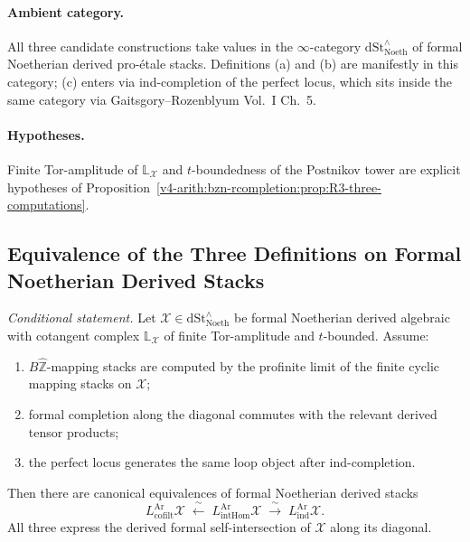 \paragraph{Ambient category.} All three candidate
constructions take values in the \(\infty\)-category
\(\mathrm{dSt}^{\wedge}_{\mathrm{Noeth}}\) of formal Noetherian
derived pro-\'etale stacks. Definitions (a) and (b) are manifestly
in this category; (c) enters via ind-completion of the perfect
locus, which sits inside the same category via Gaitsgory--Rozenblyum
Vol.~I Ch.~5.

\paragraph{Hypotheses.} Finite Tor-amplitude of
\(\mathbb{L}_{\mathcal{X}}\) and \(t\)-boundedness of the Postnikov
tower are explicit hypotheses of
Proposition~\ref{v4-arith:bzn-rcompletion:prop:R3-three-computations}.

\subsection{Equivalence of the Three Definitions on Formal Noetherian Derived Stacks}

\begin{theorem}
\label{v4-arith:bzn-rcompletion:thm:R3-three-agree}
\emph{Conditional statement.} Let \(\mathcal{X}\in\mathrm{dSt}^{\wedge}_{\mathrm{Noeth}}\)
be formal Noetherian derived algebraic with cotangent complex
\(\mathbb{L}_{\mathcal{X}}\) of finite Tor-amplitude and
\(t\)-bounded. Assume:
\begin{enumerate}
\item \(B\widehat{\mathbb Z}\)-mapping stacks are computed by the
profinite limit of the finite cyclic mapping stacks on \(\mathcal X\);
\item formal completion along the diagonal commutes with the relevant
derived tensor products;
\item the perfect locus generates the same loop object after
ind-completion.
\end{enumerate}
Then there are canonical equivalences of formal
Noetherian derived stacks
\begin{equation}
\label{v4-arith:bzn-rcompletion:eq:three-agree}
L^{\mathrm{Ar}}_{\mathrm{cofilt}}\mathcal{X}
\;\xleftarrow{\;\sim\;}\;L^{\mathrm{Ar}}_{\mathrm{intHom}}\mathcal{X}
\;\xrightarrow{\;\sim\;}\;L^{\mathrm{Ar}}_{\mathrm{ind}}\mathcal{X}.
\end{equation}
All three express the derived formal self-intersection of
\(\mathcal{X}\) along its diagonal.
\end{theorem}


